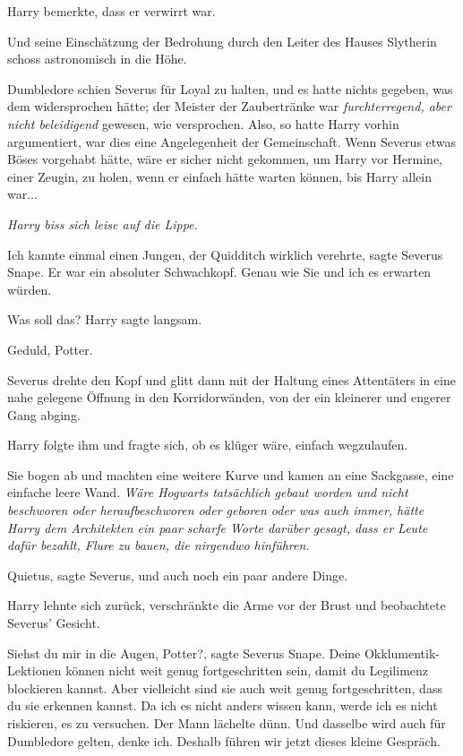 Harry bemerkte, dass er verwirrt war.

Und seine Einschätzung der Bedrohung durch den Leiter des Hauses Slytherin
schoss astronomisch in die Höhe.

Dumbledore schien Severus für Loyal zu halten, und es hatte nichts gegeben, was
dem widersprochen hätte; der Meister der Zaubertränke war \glqq{}
\emph{furchterregend, aber nicht beleidigend}\grqq{} gewesen, wie versprochen.
Also, so hatte Harry vorhin argumentiert, war dies eine Angelegenheit der
Gemeinschaft. Wenn Severus etwas Böses vorgehabt hätte, wäre er sicher nicht
gekommen, um Harry vor Hermine, einer Zeugin, zu holen, wenn er einfach hätte
warten können, bis Harry allein war...

\emph{Harry biss sich leise auf die Lippe.}

\glqq{}Ich kannte einmal einen Jungen, der Quidditch wirklich verehrte\grqq{},
sagte Severus Snape. \glqq{}Er war ein absoluter Schwachkopf. Genau wie Sie und
ich es erwarten würden.\grqq{}

\glqq{}Was soll das?\grqq{} Harry sagte langsam.

\glqq{}Geduld, Potter.\grqq{}

Severus drehte den Kopf und glitt dann mit der Haltung eines Attentäters in eine
nahe gelegene Öffnung in den Korridorwänden, von der ein kleinerer und engerer
Gang abging.

Harry folgte ihm und fragte sich, ob es klüger wäre, einfach wegzulaufen.

Sie bogen ab und machten eine weitere Kurve und kamen an eine Sackgasse, eine
einfache leere Wand. \emph{Wäre Hogwarts tatsächlich gebaut worden und nicht
beschworen oder heraufbeschworen oder geboren oder was auch immer, hätte Harry
dem Architekten ein paar scharfe Worte darüber gesagt, dass er Leute dafür
bezahlt, Flure zu bauen, die nirgendwo hinführen.}

\glqq{}Quietus\grqq{}, sagte Severus, und auch noch ein paar andere Dinge.

Harry lehnte sich zurück, verschränkte die Arme vor der Brust und beobachtete
Severus' Gesicht.

\glqq{}Siehst du mir in die Augen, Potter?\grqq{}, sagte Severus Snape. \glqq{}
Deine Okklumentik-Lektionen können nicht weit genug fortgeschritten sein, damit
du Legilimenz blockieren kannst. Aber vielleicht sind sie auch weit genug
fortgeschritten, dass du sie erkennen kannst. Da ich es nicht anders wissen
kann, werde ich es nicht riskieren, es zu versuchen.\grqq{} Der Mann lächelte
dünn. \glqq{}Und dasselbe wird auch für Dumbledore gelten, denke ich. Deshalb
führen wir jetzt dieses kleine Gespräch.\grqq{}

